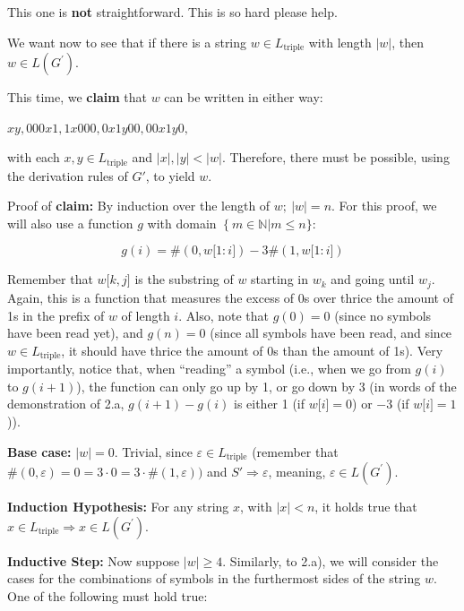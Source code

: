 \documentclass[12pt]{article}
\begin{document}
This one is \textbf{not} straightforward. This is so hard please help.

We want now to see that if there is a string \(w \in L_{\text{triple}}\)
with length \(|w|\), then \(w \in L\left( G^{'} \right)\text{.\ }\)

This time, we \textbf{claim} that \(w\) can be written in either way:

\begin{center}
    \(xy, 000x1, 1x000, 0x1y00, 00x1y0,\)     
\end{center}

with each \(x,y \in L_{\text{triple}}\) and \(|x|,|y| < |w|\). Therefore, there
must be possible, using the derivation rules of \(G'\), to yield \(w\).

Proof of \textbf{claim:} By induction over the length of
\(w;\ |w| = n\). For this proof, we will also use a function \(g\) with
domain \(\left\{ m \in \mathbb{N} \right|m \leq n\}\):

\[g(i) = \#(0,w\lbrack 1:i\rbrack) - 3\#(1,w\lbrack 1:i\rbrack)\]

Remember that \(w\lbrack k,j\rbrack\) is the substring of \(w\) starting
in \(w_{k}\) and going until \(w_{j}\). Again, this is a function that
measures the excess of 0s over thrice the amount of 1s in the prefix of
\(w\) of length \(i\). Also, note that \(g(0) = 0\) (since no symbols
have been read yet), and \(g(n) = 0\) (since all symbols have been read,
and since \(w \in L_{\text{triple}}\), it should have thrice the amount
of 0s than the amount of 1s). Very importantly, notice that, when
``reading'' a symbol (i.e., when we go from \(g(i)\) to \(g(i + 1)\)),
the function can only go up by 1, or go down by 3 (in words of the
demonstration of 2.a, \(g(i + 1) - g(i)\) is either 1 (if 
\(w\lbrack i\rbrack = 0\)) or \(-\)3 (if \(w\lbrack i\rbrack = 1\))).

\textbf{Base case:} \(|w| = 0\). Trivial, since
\(\varepsilon \in L_{\text{triple}}\) (remember that
\(\#(0,\varepsilon) = 0 = 3 \cdot 0 = 3 \cdot \#(1,\varepsilon))\) and
\(S' \Rightarrow \varepsilon\), meaning,
\(\varepsilon \in L\left( G^{'} \right).\)

\textbf{Induction Hypothesis:} For any string \(x\), with \(|x| < n\), it holds
true that \(x \in L_{\text{triple}} \Rightarrow x \in L(G^{'})\).

\textbf{Inductive Step:} Now suppose \(|w| \geq 4.\) Similarly, to 2.a), we will
consider the cases for the combinations of symbols in the furthermost
sides of the string \(w\). One of the following must hold true:
\end{document}
